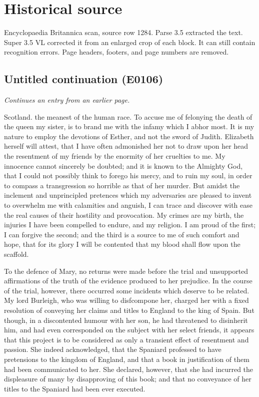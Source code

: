 \documentclass{article}
\begin{document}
\section*{Historical source}
Encyclopaedia Britannica scan, source row 1284. Parse 3.5 extracted the text. Super 3.5 VL corrected it from an enlarged crop of each block. It can still contain recognition errors.
Page headers, footers, and page numbers are removed.

\subsection*{Untitled continuation (E0106)}
\textit{Continues an entry from an earlier page.}

Scotland. the meanest of the human race. To accuse me of felonying the death of the queen my sister, is to brand me with the infamy which I abhor most. It is my nature to employ the devotions of Esther, and not the sword of Judith. Elizabeth herself will attest, that I have often admonished her not to draw upon her head the resentment of my friends by the enormity of her cruelties to me. My innocence cannot sincerely be doubted; and it is known to the Almighty God, that I could not possibly think to forego his mercy, and to ruin my soul, in order to compass a transgression so horrible as that of her murder. But amidst the inclement and unprincipled pretences which my adversaries are pleased to invent to overwhelm me with calamities and anguish, I can trace and discover with ease the real causes of their hostility and provocation. My crimes are my birth, the injuries I have been compelled to endure, and my religion. I am proud of the first; I can forgive the second; and the third is a source to me of such comfort and hope, that for its glory I will be contented that my blood shall flow upon the scaffold.

To the defence of Mary, no returns were made before the trial and unsupported affirmations of the truth of the evidence produced to her prejudice. In the course of the trial, however, there occurred some incidents which deserve to be related. My lord Burleigh, who was willing to disfcompone her, charged her with a fixed resolution of conveying her claims and titles to England to the king of Spain. But though, in a discontented humour with her son, he had threatened to disinherit him, and had even corresponded on the subject with her select friends, it appears that this project is to be considered as only a transient effect of resentment and passion. She indeed acknowledged, that the Spaniard professed to have pretensions to the kingdom of England, and that a book in justification of them had been communicated to her. She declared, however, that she had incurred the displeasure of many by disapproving of this book; and that no conveyance of her titles to the Spaniard had been ever executed.
\end{document}
